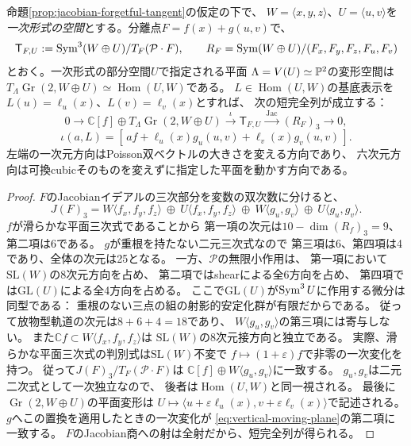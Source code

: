 \begin{proposition}[七次元の核の幾何的分解]\label{prop:vertical-seven}
命題\ref{prop:jacobian-forgetful-tangent}の仮定の下で、
$W=\langle x,y,z\rangle$、$U=\langle u,v\rangle$を
\emph{一次形式の空間}とする。分離点$F=f(x)+g(u,v)$で、
\[
 \mathsf T_{F,U}:=\operatorname{Sym}^3(W\oplus U)/T_F(\mathcal P\cdot F),
 \qquad R_F=\operatorname{Sym}(W\oplus U)/(F_x,F_y,F_z,F_u,F_v)
\]
とおく。一次形式の部分空間$U$で指定される平面
$\Lambda=V(U)\simeq\mathbb P^2$の変形空間は
$T_{\Lambda}\operatorname{Gr}(2,W\oplus U)
\simeq\operatorname{Hom}(U,W)$である。
$L\in\operatorname{Hom}(U,W)$の基底表示を
$L(u)=\ell_u(x)$、$L(v)=\ell_v(x)$とすれば、
次の短完全列が成立する：
\[
 0\longrightarrow
 \mathbb C[f]\oplus T_{\Lambda}\operatorname{Gr}(2,W\oplus U)
 \xrightarrow{\ \iota\ } \mathsf T_{F,U}
 \xrightarrow{\ \mathrm{Jac}\ } (R_F)_3
 \longrightarrow0,
 \tag{V}\label{eq:vertical-seven-exact}
\]
\[
 \iota(a,L)=[\,a f+\ell_u(x)g_u(u,v)+\ell_v(x)g_v(u,v)\,].
 \tag{VM}\label{eq:vertical-moving-plane}
\]
左端の一次元方向はPoisson双ベクトルの大きさを変える方向であり、
六次元方向は可換cubicそのものを変えずに指定した平面を動かす方向である。
\end{proposition}
\begin{proof}
$F$のJacobianイデアルの三次部分を変数の双次数に分けると、
\[
 J(F)_3=
 W\langle f_x,f_y,f_z\rangle\ \oplus\
 U\langle f_x,f_y,f_z\rangle\ \oplus\
 W\langle g_u,g_v\rangle\ \oplus\
 U\langle g_u,g_v\rangle.
\]
$f$が滑らかな平面三次式であることから
第一項の次元は$10-\dim(R_f)_3=9$、第二項は6である。
$g$が重根を持たない二元三次式なので
第三項は6、第四項は4であり、全体の次元は25となる。
一方、$\mathcal P$の無限小作用は、
第一項において$\mathrm{SL}(W)$の8次元方向を占め、
第二項ではshearによる全6方向を占め、
第四項では$\mathrm{GL}(U)$による全4方向を占める。
ここで$\mathrm{GL}(U)$が$\operatorname{Sym}^3U$に作用する微分は同型である：
重根のない三点の組の射影的安定化群が有限だからである。
従って放物型軌道の次元は$8+6+4=18$であり、
$W\langle g_u,g_v\rangle$の第三項には寄与しない。
また$\mathbb Cf\subset W\langle f_x,f_y,f_z\rangle$は
$\mathrm{SL}(W)$の8次元接方向と独立である。
実際、滑らかな平面三次式の判別式は$\mathrm{SL}(W)$不変で
$f\mapsto(1+\varepsilon)f$で非零の一次変化を持つ。
従って$J(F)_3/T_F(\mathcal P\cdot F)$は
$\mathbb C[f]\oplus W\langle g_u,g_v\rangle$に一致する。
$g_u,g_v$は二元二次式として一次独立なので、
後者は$\operatorname{Hom}(U,W)$と同一視される。
最後に$\operatorname{Gr}(2,W\oplus U)$の平面変形は
$U\mapsto\langle u+\varepsilon\ell_u(x),
 v+\varepsilon\ell_v(x)\rangle$で記述される。
$g$へこの置換を適用したときの一次変化が
\eqref{eq:vertical-moving-plane}の第二項に一致する。
$F$のJacobian商への射は全射だから、短完全列が得られる。
\end{proof}

